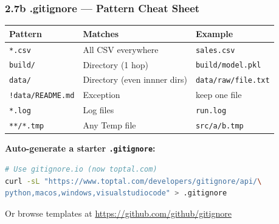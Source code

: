 \documentclass{beamer}
\begin{document}
\begin{frame}[fragile]
\frametitle{2.7b .gitignore --- Pattern Cheat Sheet}

\begin{table}[h]
\centering
\tiny
\begin{tabular}{lll}
\toprule
\textbf{Pattern} & \textbf{Matches} & \textbf{Example} \\
\midrule
\texttt{*.csv} & All CSV everywhere & \texttt{sales.csv} \\
\texttt{build/} & Directory (1 hop) & \texttt{build/model.pkl} \\
\texttt{data/} & Directory (even innner dirs) & \texttt{data/raw/file.txt} \\

\texttt{!data/README.md} & Exception & keep one file \\
\texttt{*.log} & Log files & \texttt{run.log} \\

\texttt{**/*.tmp} & Any Temp file & \texttt{src/a/b.tmp} \\
\bottomrule
\end{tabular}
\end{table}

\vspace{2mm}
\textbf{Auto-generate a starter \texttt{.gitignore}:}
\begin{lstlisting}[language=bash]
# Use gitignore.io (now toptal.com)
curl -sL "https://www.toptal.com/developers/gitignore/api/\
python,macos,windows,visualstudiocode" > .gitignore
\end{lstlisting}

Or browse templates at \url{https://github.com/github/gitignore}
\end{frame}
\end{document}

